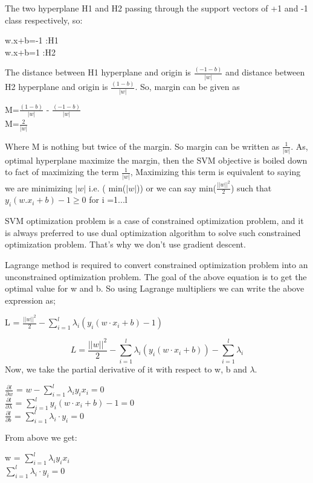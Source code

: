 \documentclass[hidelinks,11pt]{article}
\begin{document}
	The two hyperplane H1 and H2 passing through the support vectors of +1 and -1 class respectively, so:
	\begin{center}
	w.x+b=-1 :H1\\
	w.x+b=1 :H2    
	\end{center}
	The distance between H1 hyperplane and origin is $\frac{(-1-b)}{|w|}$ and distance between H2 hyperplane and origin is $\frac{(1-b)}{|w|}$. So, margin can be given as
	\begin{center}
	M=$\frac{(1-b)}{|w|}$ - $\frac{(-1-b)}{|w|}$\\
	M=$\frac{2}{|w|}$
	\end{center}
	Where M is nothing but twice of the margin. So margin can be written as $\frac{1}{|w|}$. As, optimal hyperplane maximize the margin, then the SVM objective is boiled down to fact of maximizing the term $\frac{1}{|w|}$,
	Maximizing this term is equivalent to saying we are minimizing $|w|$ i.e. ( min($|w|$))
	or we can say min($\frac{||w||^2}{2}$) such that $y_i(w.x_i + b)-1 \geq 0$ for i =1...l

	SVM optimization problem is a case of constrained optimization problem, and it is always preferred to use dual optimization algorithm to solve such constrained optimization problem. That’s why we don’t use gradient descent.

	Lagrange method is required to convert constrained optimization problem into an unconstrained optimization problem. The goal of the above equation is to get the optimal value for w and b. So using Lagrange multipliers we can write the above expression as;
	\begin{center}
	    L = $\frac{||w||^2}{2} - \sum_{i=1}^{l} \lambda_i(y_i(w\cdot x_i+b)-1)$\\
	\end{center}
	\begin{equation}
	            L = \frac{||w||^2}{2} - \sum_{i=1}^{l} \lambda_i(y_i(w\cdot x_i+b))-\sum_{i=1}^{l}\lambda_i
	\end{equation}
	Now, we take the partial derivative of it with respect to w, b and $\lambda$.
	\begin{center}
	        $\frac{\partial l}{\partial w}$ = $w - \sum_{i=1}^{l} \lambda_i y_i x_i=0$\\
	        $\frac{\partial l}{\partial \lambda}$ = $ \sum_{i=1}^{l} y_i (w \cdot x_i+b)-1=0$\\
	        $\frac{\partial l}{\partial b}$ = $ \sum_{i=1}^{l} \lambda_i \cdot y_i=0$
	\end{center}
	From above we get:
	\begin{center}
	        w = $\sum_{i=1}^{l} \lambda_i y_i x_i$\\
	        $ \sum_{i=1}^{l} \lambda_i \cdot y_i=0$
	\end{center}
\end{document}
